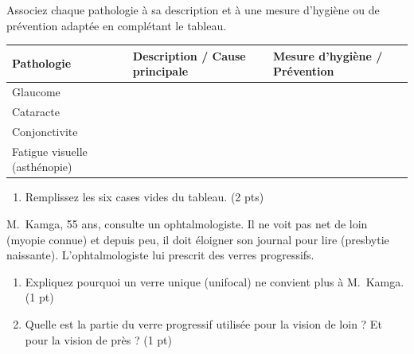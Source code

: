 \documentclass[11pt]{article}
\begin{document}
\begin{exercice}
Associez chaque pathologie à sa description et à une mesure d'hygiène ou de prévention adaptée en complétant le tableau.
\begin{center}
\begin{tabular}{|p{2.5cm}|p{5.5cm}|p{5.5cm}|}
\hline
\textbf{Pathologie} & \textbf{Description / Cause principale} & \textbf{Mesure d'hygiène / Prévention} \\
\hline
Glaucome & & \\
\hline
Cataracte & & \\
\hline
Conjonctivite & & \\
\hline
Fatigue visuelle (asthénopie) & & \\
\hline
\end{tabular}
\end{center}
\begin{enumerate}
    \item Remplissez les six cases vides du tableau. \hfill (2 pts)
\end{enumerate}
\end{exercice}

\begin{exercice}
M.~Kamga, 55 ans, consulte un ophtalmologiste. Il ne voit pas net de loin (myopie connue) et depuis peu, il doit éloigner son journal pour lire (presbytie naissante). L'ophtalmologiste lui prescrit des verres progressifs.
\begin{enumerate}
    \item Expliquez pourquoi un verre unique (unifocal) ne convient plus à M.~Kamga. \hfill (1 pt)
    \item Quelle est la partie du verre progressif utilisée pour la vision de loin ? Et pour la vision de près ? \hfill (1 pt)
\end{enumerate}
\end{exercice}
\end{document}
